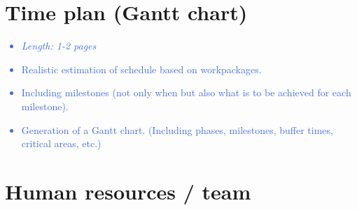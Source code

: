 \documentclass[a4paper,11pt]{article}
\providecommand*{\note}[1]{\small \textcolor{RoyalBlue}{\begin{minipage}{\textwidth}{#1}\end{minipage}}}
\begin{document}
\section{Time plan (Gantt chart)}
\label{sect:timeplan}

\note{
\begin{itemize}
\item {\em Length: 1-2 pages}
\item Realistic estimation of schedule based on workpackages.
\item Including milestones (not only when but also what is to be achieved for each milestone).
\item Generation of a Gantt chart. (Including phases, milestones, buffer times, critical areas, etc.)
\end{itemize}
}

\section{Human resources / team}
\label{sect:team}
\end{document}
